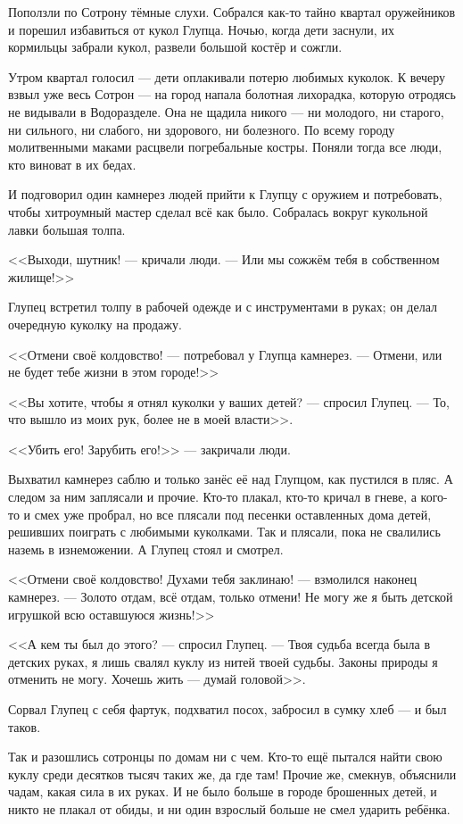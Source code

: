 Поползли по Сотрону тёмные слухи.
Собрался как-то тайно квартал оружейников и порешил избавиться от кукол Глупца.
Ночью, когда дети заснули, их кормильцы забрали кукол, развели большой костёр и сожгли.

Утром квартал голосил --- дети оплакивали потерю любимых куколок.
К вечеру взвыл уже весь Сотрон --- на город напала болотная лихорадка, которую отродясь не видывали в Водоразделе.
Она не щадила никого --- ни молодого, ни старого, ни сильного, ни слабого, ни здорового, ни болезного.
По всему городу молитвенными маками расцвели погребальные костры.
Поняли тогда все люди, кто виноват в их бедах.

И подговорил один камнерез людей прийти к Глупцу с оружием и потребовать, чтобы хитроумный мастер сделал всё как было.
Собралась вокруг кукольной лавки большая толпа.

<<Выходи, шутник! --- кричали люди.
--- Или мы сожжём тебя в собственном жилище!>>

Глупец встретил толпу в рабочей одежде и с инструментами в руках;
он делал очередную куколку на продажу.

<<Отмени своё колдовство! --- потребовал у Глупца камнерез.
--- Отмени, или не будет тебе жизни в этом городе!>>

<<Вы хотите, чтобы я отнял куколки у ваших детей? --- спросил Глупец.
--- То, что вышло из моих рук, более не в моей власти>>.

<<Убить его!
Зарубить его!>> --- закричали люди.

Выхватил камнерез саблю и только занёс её над Глупцом, как пустился в пляс.
А следом за ним заплясали и прочие.
Кто-то плакал, кто-то кричал в гневе, а кого-то и смех уже пробрал, но все плясали под песенки оставленных дома детей, решивших поиграть с любимыми куколками.
Так и плясали, пока не свалились наземь в изнеможении.
А Глупец стоял и смотрел.

<<Отмени своё колдовство!
Духами тебя заклинаю! --- взмолился наконец камнерез.
--- Золото отдам, всё отдам, только отмени!
Не могу же я быть детской игрушкой всю оставшуюся жизнь!>>

<<А кем ты был до этого? --- спросил Глупец.
--- Твоя судьба всегда была в детских руках, я лишь свалял куклу из нитей твоей судьбы.
Законы природы я отменить не могу.
Хочешь жить --- думай головой>>.

Сорвал Глупец с себя фартук, подхватил посох, забросил в сумку хлеб --- и был таков.

Так и разошлись сотронцы по домам ни с чем.
Кто-то ещё пытался найти свою куклу среди десятков тысяч таких же, да где там!
Прочие же, смекнув, объяснили чадам, какая сила в их руках.
И не было больше в городе брошенных детей, и никто не плакал от обиды, и ни один взрослый больше не смел ударить ребёнка.

